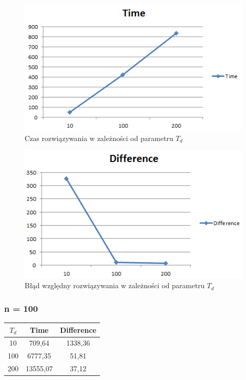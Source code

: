 \documentclass[wide,a4paper,titlepage,12pt] {article}
\begin{document}
\begin{figure}[htbp]
  \begin{center}
         \includegraphics[scale=0.8]{charts/time50.PNG}
         \caption{Czas rozwiązywania w zależności od parametru $T_d$}
  \end{center}
\end{figure}

\begin{figure}[htbp]
  \begin{center}
         \includegraphics[scale=0.8]{charts/diff50.PNG}
         \caption{Błąd względny rozwiązywania w zależności od parametru $T_d$}
  \end{center}
\end{figure}

\newpage
\subsubsection{n = 100}
\begin{center}
    \begin{tabular}{|c|c|c|}
      \hline
       $T_{d}$ & Time & Difference \\ \hline
          10&    709,64 & 1338,36\\ \hline
            100 &6777,35 &51,81\\ \hline
            200 &13555,07 &   37,12\\ \hline

  \end{tabular}
\end{center}
\end{document}
